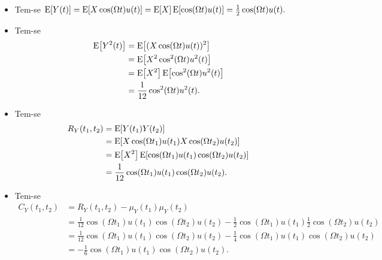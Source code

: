 \begin{respostas}

\begin{itemize}
    \item [a)] Tem-se
    $
        \mathrm{E}\!\left[Y(t)\right] 
        = \mathrm{E}\!\left[X\cos(\Omega t)u(t)\right]
        = \mathrm{E}\!\left[X\right]\mathrm{E}\!\left[\cos(\Omega t)u(t)\right]
        = \frac{1}{2} \cos(\Omega t)u(t).
    $

    \item [b)] Tem-se
    \begin{align}
        \mathrm{E}\!\left[Y^2(t)\right] 
        &= \mathrm{E}\!\left[(X\cos(\Omega t)u(t))^2\right] \\
        &= \mathrm{E}\!\left[X^2\cos^2(\Omega t)u^2(t)\right] \\
        &= \mathrm{E}\!\left[X^2\right]\mathrm{E}\!\left[\cos^2(\Omega t)u^2(t)\right] \\
        &= \frac{1}{12} \cos^2(\Omega t)u^2(t).
    \end{align}

    \item [c)] Tem-se
    \begin{align}
        R_Y(t_1, t_2) 
        &= \mathrm{E}\!\left[Y(t_1)Y(t_2)\right] \\
        &= \mathrm{E}\!\left[X\cos(\Omega t_1)u(t_1)X\cos(\Omega t_2)u(t_2)\right] \\
        &= \mathrm{E}\!\left[X^2\right]\mathrm{E}\!\left[\cos(\Omega t_1)u(t_1)\cos(\Omega t_2)u(t_2)\right] \\
        &= \frac{1}{12} \cos(\Omega t_1)u(t_1)\cos(\Omega t_2)u(t_2).
    \end{align}

    \item [d)] Tem-se
    \begin{align}
        C_Y(t_1, t_2) 
        &= R_Y(t_1, t_2) - \mu_Y(t_1)\mu_Y(t_2) \\
        &= \frac{1}{12} \cos(\Omega t_1)u(t_1)\cos(\Omega t_2)u(t_2) - 
           \frac{1}{2} \cos(\Omega t_1)u(t_1) 
           \frac{1}{2} \cos(\Omega t_2)u(t_2) \\
        &= \frac{1}{12} \cos(\Omega t_1)u(t_1)\cos(\Omega t_2)u(t_2) - 
           \frac{1}{4} \cos(\Omega t_1)u(t_1)\cos(\Omega t_2)u(t_2) \\
        &= -\frac{1}{6} \cos(\Omega t_1)u(t_1)\cos(\Omega t_2)u(t_2).
    \end{align}


\end{itemize}
\end{respostas}
